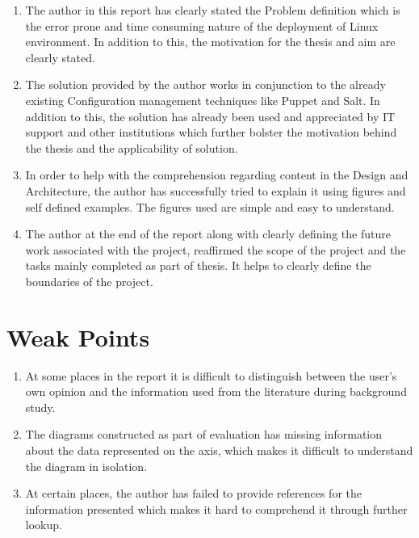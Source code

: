 \documentclass[12pt]{article}
\begin{document}
\begin{enumerate}

\item The author in this report has clearly stated the Problem definition which is the error prone and time consuming nature of the deployment of Linux environment. In addition to this, the motivation for the thesis and aim are clearly stated. 

\item The solution provided by the author works in conjunction to the already existing Configuration management techniques like Puppet and Salt. In addition to this, the solution has already been used and appreciated by IT support and other institutions which further bolster the motivation behind the thesis and the applicability of solution. 

\item In order to help with the comprehension regarding content in the Design and Architecture, the author has successfully tried to explain it using figures and self defined examples. The figures used are simple and easy to understand. 

\item The author at the end of the report along with clearly defining the future work associated with the project, reaffirmed the scope of the project and the tasks mainly completed as part of thesis. It helps to clearly define the boundaries of the project.

\end{enumerate}


\section{Weak Points}

\begin{enumerate}

\item At some places in the report it is difficult to distinguish between the user's own opinion and the information used from the literature during background study.

\item The diagrams constructed as part of evaluation has missing information about the data represented on the axis, which makes it difficult to understand the diagram in isolation.

\item At certain places, the author has failed to provide references for the information presented which makes it hard to comprehend it through further lookup.

\end{enumerate}
\end{document}
